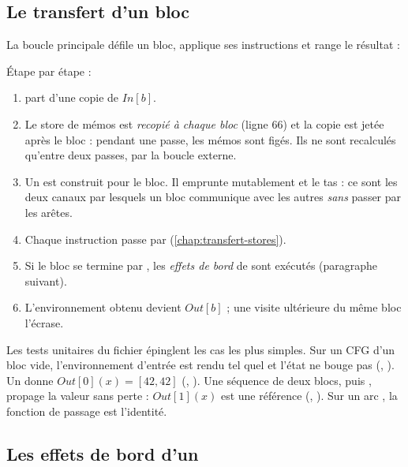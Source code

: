 \subsection{Le transfert d'un bloc}

La boucle principale défile un bloc, applique ses instructions et range le
résultat :


Étape par étape :
\begin{enumerate}
  \item {} part d'une copie de $\mathit{In}[b]$.
  \item Le store de mémos est \emph{recopié à chaque bloc} (ligne 66) et la
    copie est jetée après le bloc : pendant une passe, les mémos sont figés.
    Ils ne sont recalculés qu'entre deux passes, par la boucle externe.
  \item Un  est construit pour le bloc. Il emprunte
    mutablement  et le tas : ce sont les deux canaux par
    lesquels un bloc communique avec les autres \emph{sans} passer par les
    arêtes.
  \item Chaque instruction passe par 
    (\cref{chap:transfert-stores}).
  \item Si le bloc se termine par , les \emph{effets de bord}
    de  sont exécutés (paragraphe suivant).
  \item L'environnement obtenu devient $\mathit{Out}[b]$ ; une visite
    ultérieure du même bloc l'écrase.
\end{enumerate}

Les tests unitaires du fichier épinglent les cas les plus simples. Sur un CFG
d'un bloc vide, l'environnement d'entrée est rendu tel quel et l'état ne bouge
pas (,
). Un  donne
$\mathit{Out}[0](x) = [42,42]$ (,
). Une séquence de deux blocs,
 puis , propage la valeur sans perte :
$\mathit{Out}[1](x)$ est une référence 
(,
). Sur un arc , la
fonction de passage est l'identité.

\subsection{Les effets de bord d'un }
\label{sec:cfg-analyzer-dominance-return}

